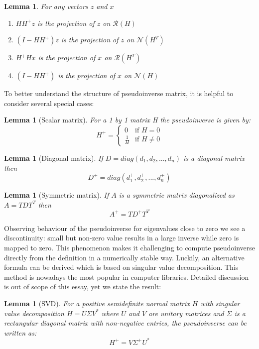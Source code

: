 \documentclass[a4paper]{article}
\theoremstyle{break}
\newtheorem{lemma}[theorem]{Lemma}
\newcommand{\Nu}{\mathcal{N}}
\newcommand{\Ra}{\mathcal{R}}
\begin{document}
\begin{lemma}
    For any vectors $z$ and $x$
    \begin{enumerate}
        \item $ H H^+ z $ is the projection of $z$ on $\Ra(H)$
        \item $ (I - H H^+) z $ is the projection of $z$ on $\Nu(H^T)$
        \item $ H^+ H x$ is the projection of $x$ on $ \Ra(H^T)$
        \item $ (I - H H^+) $ is the projection of $x$ on $ \Nu(H)$
    \end{enumerate}
\end{lemma}

To better understand the structure of pseudoinverse matrix, it is helpful to consider several special cases:
\begin{lemma}[Scalar matrix]
    For a 1 by 1 matrix H the pseudoinverse is given by:
    $$ H^+ = \begin{cases}
        0~~~           \text{ if } H = 0\\
        \frac{1}{H}~~ \text{ if } H \neq 0
    \end{cases}$$
\end{lemma}
\begin{lemma}[Diagonal matrix]
    If $D = diag(d_1, d_2, ..., d_n)$ is a diagonal matrix then
    $$ D^+ = diag(d_1^+, d_2^+, ..., d_n^+) $$
\end{lemma}
\begin{lemma}[Symmetric matrix]
    If $A$ is a symmetric matrix diagonalized as $A = T D T^T $ then
    $$ A^+ = T D^+ T^T$$
\end{lemma}

Observing behaviour of the pseudoinverse for eigenvalues close to zero we see a discontinuity: small but non-zero value results in a large inverse while zero is mapped to zero. This phenomenon makes it challenging to compute pseudoinverse directly from the definition in a numerically stable way. Luckily, an alternative formula can be derived which is based on singular value decomposition. This method is nowadays the most popular in computer libraries. Detailed discussion is out of scope of this essay, yet we state the result:
\begin{lemma}[SVD]
    For a positive semidefinite normal matrix $H$ with singular value decomposition $H = U \Sigma V^*$ where $U$ and $V$ are unitary matrices and $\Sigma$ is a rectangular diagonal matrix with non-negative entries, the pseudoinverse can be written as:
    $$ H^+ = V \Sigma^+ U^* $$
\end{lemma}
\end{document}
